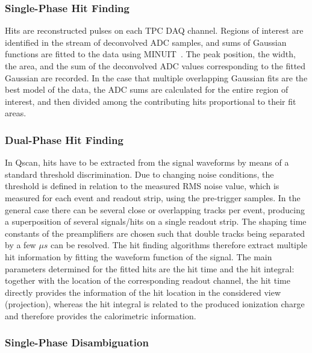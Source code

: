 \subsubsection{Single-Phase Hit Finding}

Hits are reconstructed pulses on each TPC DAQ channel.  Regions of
interest are identified in the stream of deconvolved ADC samples, and
sums of Gaussian functions are fitted to the data using
MINUIT~\cite{James:1994vla}.  The peak position, the width, the area, and the
sum of the deconvolved ADC values corresponding to the fitted
Gaussian are recorded.  In the case that multiple overlapping Gaussian
fits are the best model of the data, the ADC sums are calculated for
the entire region of interest, and then divided among the contributing
hits proportional to their fit areas.  


\subsubsection{Dual-Phase Hit Finding}

In Qscan, hits have to be extracted from the signal waveforms by means of a standard threshold discrimination. 
Due to changing noise conditions, the threshold is defined in relation to the measured RMS noise value, 
which is measured for each event and readout strip, using the pre-trigger samples.
In the general case there can be several close or overlapping tracks per event, producing a superposition of several signals/hits on a single readout strip. 
The shaping time constants of the preamplifiers are chosen such that double tracks being separated by a few $\mu s$ can be resolved.
The hit finding algorithms therefore extract multiple hit information by fitting the waveform function of the signal.
The main parameters determined for the fitted hits are the hit time and the hit integral: 
together with the location of the corresponding readout channel, the hit time directly provides the information of the hit location in the considered view (projection), whereas the hit integral is related to the produced ionization charge and therefore provides the calorimetric information.


\subsubsection{Single-Phase Disambiguation}

